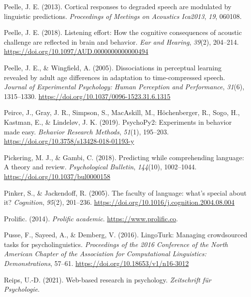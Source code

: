 \documentclass[a4paper, nobind]{templates/ociamthesis}
\newlength{\cslhangindent}
\newenvironment{CSLReferences}[2] %
 {%
  \setlength{\parindent}{0pt}
  \ifodd #1
  \let\oldpar\par
  \def\par{\hangindent=\cslhangindent\oldpar}
  \fi
  \setlength{\parskip}{1mm}
  \setlength{\baselineskip}{6mm}
 }%
 {}
\begin{document}
\begin{CSLReferences}{1}{0}
\leavevmode{}%
Peelle, J. E. (2013). Cortical responses to degraded speech are modulated by linguistic predictions. \emph{Proceedings of Meetings on Acoustics Ica2013}, \emph{19}, 060108.

\leavevmode{}%
Peelle, J. E. (2018). {Listening effort: How the cognitive consequences of acoustic challenge are reflected in brain and behavior}. \emph{Ear and Hearing}, \emph{39}(2), 204--214. \url{https://doi.org/10.1097/AUD.0000000000000494}

\leavevmode{}%
Peelle, J. E., \& Wingfield, A. (2005). {Dissociations in perceptual learning revealed by adult age differences in adaptation to time-compressed speech}. \emph{Journal of Experimental Psychology: Human Perception and Performance}, \emph{31}(6), 1315--1330. \url{https://doi.org/10.1037/0096-1523.31.6.1315}

\leavevmode{}%
Peirce, J., Gray, J. R., Simpson, S., MacAskill, M., Höchenberger, R., Sogo, H., Kastman, E., \& Lindeløv, J. K. (2019). {PsychoPy2: Experiments in behavior made easy}. \emph{Behavior Research Methods}, \emph{51}(1), 195--203. \url{https://doi.org/10.3758/s13428-018-01193-y}

\leavevmode{}%
Pickering, M. J., \& Gambi, C. (2018). Predicting while comprehending language: A theory and review. \emph{Psychological Bulletin}, \emph{144}(10), 1002--1044. \url{https://doi.org/10.1037/bul0000158}

\leavevmode{}%
Pinker, S., \& Jackendoff, R. (2005). The faculty of language: what's special about it? \emph{Cognition}, \emph{95}(2), 201--236. \url{https://doi.org/10.1016/j.cognition.2004.08.004}

\leavevmode{}%
Prolific. (2014). \emph{Prolific academic}. \url{https://www.prolific.co}.

\leavevmode{}%
Pusse, F., Sayeed, A., \& Demberg, V. (2016). {LingoTurk: Managing crowdsourced tasks for psycholinguistics}. \emph{Proceedings of the 2016 Conference of the North American Chapter of the Association for Computational Linguistics: Demonstrations}, 57--61. \url{https://doi.org/10.18653/v1/n16-3012}

\leavevmode{}%
Reips, U.-D. (2021). Web-based research in psychology. \emph{Zeitschrift f{ü}r Psychologie}.


\end{CSLReferences}
\end{document}
